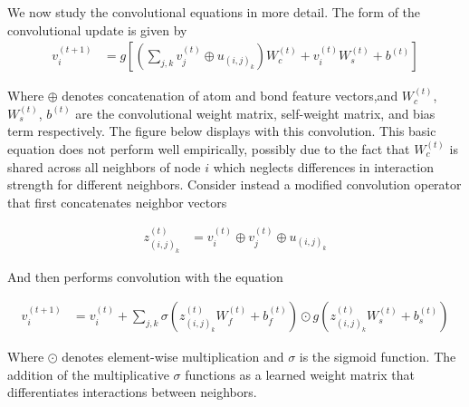 \documentclass[book.tex]{subfiles}
\begin{document}
We now study the convolutional equations in more detail. The form of the convolutional update is given by
\begin{align}
v_{i}^{(t+1)} &= g \left [ \left ( \sum_{j,k} v_j^{(t)} \oplus u_{(i,j)_k} \right ) W_c^{(t)} + v_{i}^{(t)} W_s^{(t)} + b^{(t)} \right ] 
\end{align}

Where $\oplus$ denotes concatenation of atom and bond feature vectors,and  $W_c^{(t)}$, $W_s^{(t)}$, $b^{(t)}$ are the convolutional weight matrix, self-weight matrix, and bias term respectively. The figure below displays with this convolution. This basic equation does not perform well empirically, possibly due to the fact that $W_c^{(t)}$ is shared across all neighbors of node $i$ which neglects differences in interaction strength for different neighbors. Consider instead a modified convolution operator that first concatenates neighbor vectors

\begin{align}
z_{(i,j)_k}^{(t)} &= v_i^{(t)} \oplus v_j^{(t)} \oplus u_{(i,j)_k} 
\end{align}

And then performs convolution with the equation 

\begin{align}
v_i^{(t+1)} &= v_i^{(t)} + \sum_{j,k} \sigma \left ( z_{(i,j)_k}^{(t)} W_f^{(t)} + b_f^{(t)} \right ) \odot g \left ( z_{(i,j)_k}^{(t)} W_s^{(t)} + b_s^{(t)} \right ) 
\end{align}

Where $\odot$ denotes element-wise multiplication and $\sigma$ is the sigmoid function. The addition of the multiplicative $\sigma$ functions as a learned weight matrix that differentiates interactions between neighbors. %





\end{document}
